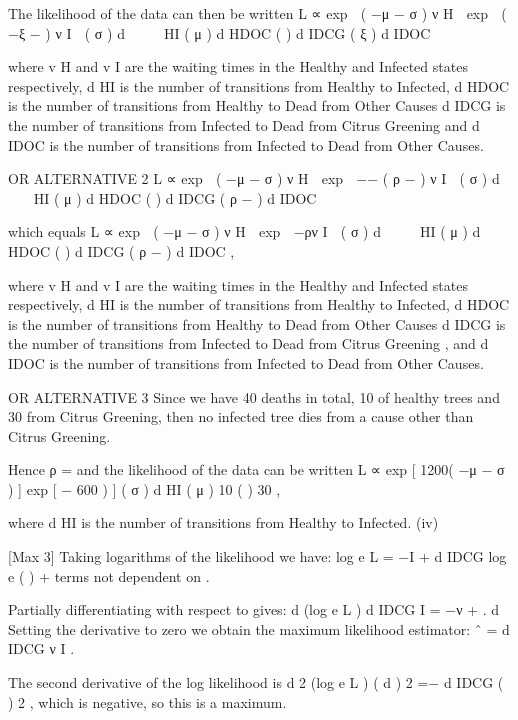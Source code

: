 \documentclass[a4paper,12pt]{article}
\begin{document}
The likelihood of the data can then be written
L ∝ exp  ( −μ − σ ) ν H  exp  ( −ξ − \tau ) ν I  ( σ ) d




HI
( μ ) d
HDOC
( \tau ) d
IDCG
( ξ ) d
IDOC

where v H and v I are the waiting times in the Healthy and Infected states
respectively,
d HI is the number of transitions from Healthy to Infected,
d HDOC is the number of transitions from Healthy to Dead from Other Causes
d IDCG is the number of transitions from Infected to Dead from Citrus
Greening
and d IDOC is the number of transitions from Infected to Dead from Other
Causes.

OR ALTERNATIVE 2
L ∝ exp  ( −μ − σ ) ν H  exp  −\tau − ( ρ − \tau ) ν I  ( σ ) d




HI
( μ ) d
HDOC
( \tau ) d
IDCG
( ρ − \tau ) d
IDOC

which equals
L ∝ exp  ( −μ − σ ) ν H  exp  −ρν I  ( σ ) d




HI
( μ ) d
HDOC
( \tau ) d
IDCG
( ρ − \tau ) d
IDOC
,

where v H and v I are the waiting times in the Healthy and Infected states
respectively,
d HI is the number of transitions from Healthy to Infected,
d HDOC is the number of transitions from Healthy to Dead from Other Causes
d IDCG is the number of transitions from Infected to Dead from Citrus
Greening
,%
and d IDOC is the number of transitions from Infected to Dead from Other
Causes.

OR ALTERNATIVE 3
Since we have 40 deaths in total, 10 of healthy trees and 30 from Citrus
Greening, then no infected tree dies from a cause other than Citrus Greening.

Hence ρ = \tau and the likelihood of the data can be written
L ∝ exp [ 1200( −μ − σ ) ] exp [ − 600 \tau ) ] ( σ ) d
HI
( μ ) 10 ( \tau ) 30 ,

where
d HI is the number of transitions from Healthy to Infected.
(iv)

[Max 3]
Taking logarithms of the likelihood we have:
log e L = − I + d IDCG log e ( \tau ) + terms not dependent on \tau.

Partially differentiating with respect to \tau gives:
d (log e L )
d IDCG
I
= −ν +
.
\tau
d \tau 
Setting the derivative to zero 
we obtain the maximum likelihood estimator:
\tau ˆ =
d IDCG
ν I
.

The second derivative of the log likelihood is
d 2 (log e L )
( d \tau ) 2
=−
d IDCG
( \tau ) 2
,
which is negative, so this is a maximum.
\end{document}
